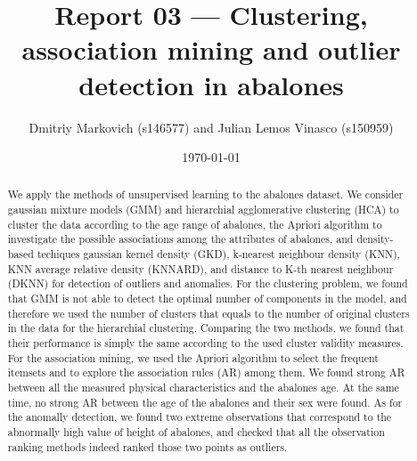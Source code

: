\documentclass[10pt, paper=a4]{article}
\begin{document}
\title{Report 03 --- Clustering, association mining and outlier detection in
  abalones}

\author{Dmitriy Markovich (s146577) and Julian Lemos Vinasco (s150959)}

\date{\today}

\maketitle

\begin{abstract}

  We apply the methods of unsupervised learning to the abalones dataset.  We
  consider gaussian mixture models (GMM) and hierarchial agglomerative
  clustering (HCA) to cluster the data according to the age range of abalones,
  the Apriori algorithm to investigate the possible associations among the
  attributes of abalones, and density-based techiques gaussian kernel density
  (GKD), k-nearest neighbour density (KNN), KNN average relative density
  (KNNARD), and distance to K-th nearest neighbour (DKNN) for detection of
  outliers and anomalies.  For the clustering problem, we found that GMM is not
  able to detect the optimal number of components in the model, and therefore we
  used the number of clusters that equals to the number of original clusters in
  the data for the hierarchial clustering.  Comparing the two methods, we found
  that their performance is simply the same according to the used cluster
  validity measures.  For the association mining, we used the Apriori algorithm
  to select the frequent itemsets and to explore the association rules (AR)
  among them.  We found strong AR between all the measured physical
  characteristics and the abalones age.  At the same time, no strong AR between
  the age of the abalones and their sex were found.  As for the anomally
  detection, we found two extreme observations that correspond to the abnormally
  high value of height of abalones, and checked that all the observation ranking
  methods indeed ranked those two points as outliers.
\end{abstract}

\end{document}
